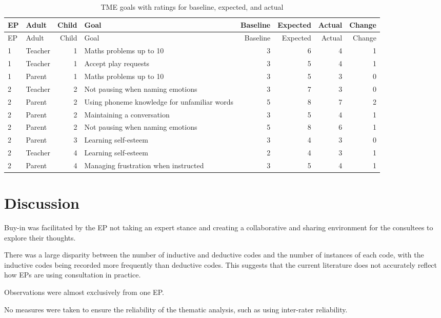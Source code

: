 \documentclass[
]{article}
\begin{document}
\begin{longtable}[]{@{}llrlrrrr@{}}
\caption{TME goals with ratings for baseline, expected, and
actual}\tabularnewline
\toprule
EP & Adult & Child & Goal & Baseline & Expected & Actual & Change \\
\midrule
\endfirsthead
\toprule
EP & Adult & Child & Goal & Baseline & Expected & Actual & Change \\
\midrule
\endhead
1 & Teacher & 1 & Maths problems up to 10 & 3 & 6 & 4 & 1 \\
1 & Teacher & 1 & Accept play requests & 3 & 5 & 4 & 1 \\
1 & Parent & 1 & Maths problems up to 10 & 3 & 5 & 3 & 0 \\
2 & Teacher & 2 & Not pausing when naming emotions & 3 & 7 & 3 & 0 \\
2 & Parent & 2 & Using phoneme knowledge for unfamiliar words & 5 & 8 &
7 & 2 \\
2 & Parent & 2 & Maintaining a conversation & 3 & 5 & 4 & 1 \\
2 & Parent & 2 & Not pausing when naming emotions & 5 & 8 & 6 & 1 \\
2 & Parent & 3 & Learning self-esteem & 3 & 4 & 3 & 0 \\
2 & Teacher & 4 & Learning self-esteem & 2 & 4 & 3 & 1 \\
2 & Parent & 4 & Managing frustration when instructed & 3 & 5 & 4 & 1 \\
\bottomrule
\end{longtable}

\hypertarget{discussion}{%
\section{Discussion}\label{discussion}}

Buy-in was facilitated by the EP not taking an expert stance and
creating a collaborative and sharing environment for the consultees to
explore their thoughts.

There was a large disparity between the number of inductive and
deductive codes and the number of instances of each code, with the
inductive codes being recorded more frequently than deductive codes.
This suggests that the current literature does not accurately reflect
how EPs are using consultation in practice.

Observations were almost exclusively from one EP.

No measures were taken to ensure the reliability of the thematic
analysis, such as using inter-rater reliability.
\end{document}
